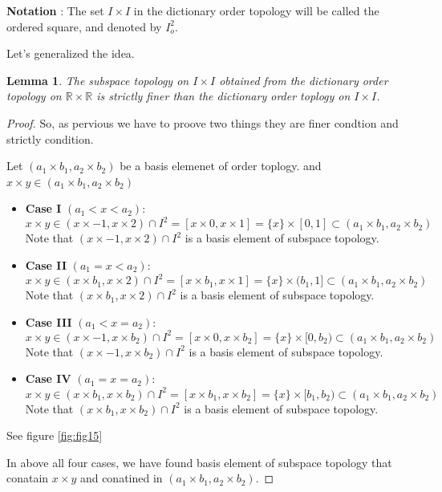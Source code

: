 \documentclass[
]{book}
\newtheorem{lemma}{Lemma}[chapter]
\theoremstyle{definition}
\theoremstyle{definition}
\theoremstyle{definition}
\theoremstyle{definition}
\theoremstyle{remark}
\begin{document}
\textbf{Notation} : The set \(I \times I\) in the dictionary order topology will be called the ordered square, and
denoted by \(I_o^2\).

Let's generalized the idea.

\begin{lemma}
\protect\hypertarget{lem:unnamed-chunk-47}{}\label{lem:unnamed-chunk-47}The subspace topology on \(I \times I\) obtained from the dictionary order topology on \(\mathbb{R} \times \mathbb{R}\) is strictly finer than the dictionary order toplogy on \(I \times I\).
\end{lemma}

\begin{proof}
So, as pervious we have to proove two things they are finer condtion and strictly condition.

Let \((a_1\times b_1, a_2 \times b_2)\) be a basis elemenet of order toplogy. and \(x\times y \in (a_1\times b_1, a_2 \times b_2)\)

\begin{itemize}
\item
  \textbf{Case I} \((a_1<x<a_2)\):
  \[x\times y \in (x\times-1,x\times 2)\cap I^2= [x\times 0,x\times 1]=\{x\}\times [0,1] \subset (a_1\times b_1, a_2 \times b_2)\]
  Note that \((x\times -1,x\times 2)\cap I^2\) is a basis element of subspace topology.
\item
  \textbf{Case II} \((a_1=x<a_2)\):
  \[x\times y \in (x\times b_1,x\times 2)\cap I^2= [x\times b_1,x\times 1]=\{x\}\times (b_1,1] \subset (a_1\times b_1, a_2 \times b_2)\]
  Note that \((x\times b_1,x\times 2)\cap I^2\) is a basis element of subspace topology.
\item
  \textbf{Case III} \((a_1<x=a_2)\):
  \[x\times y \in (x\times -1,x\times b_2)\cap I^2= [x\times 0,x\times b_2]=\{x\}\times [0,b_2) \subset (a_1\times b_1, a_2 \times b_2)\]
  Note that \((x\times -1,x\times b_2)\cap I^2\) is a basis element of subspace topology.
\item
  \textbf{Case IV} \((a_1=x=a_2)\):
  \[x\times y \in (x\times b_1,x\times b_2)\cap I^2= [x\times b_1,x\times b_2]=\{x\}\times [b_1,b_2) \subset (a_1\times b_1, a_2 \times b_2)\]
  Note that \((x\times b_1,x\times b_2)\cap I^2\) is a basis element of subspace topology.
\end{itemize}

See figure \ref{fig:fig15}

In above all four cases, we have found basis element of subspace topology that conatain \(x\times y\) and conatined in \((a_1\times b_1, a_2 \times b_2)\).
\end{proof}
\end{document}

